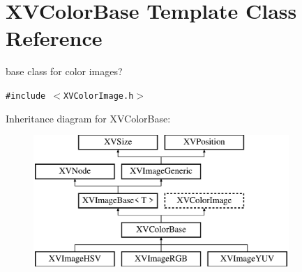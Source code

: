 \hypertarget{class_XVColorBase}{
\section{XVColor\-Base  Template Class Reference}
\label{XVColorBase}
}
base class for color images? 


{\tt \#include $<$XVColor\-Image.h$>$}

Inheritance diagram for XVColor\-Base:\begin{figure}[H]
\begin{center}
\leavevmode
\includegraphics[height=5cm]{class_XVColorBase}
\end{center}
\end{figure}
